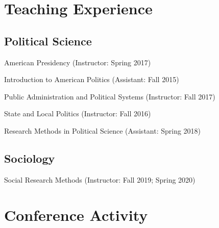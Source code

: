 \documentclass[12pt,letterpaper]{article}
\begin{document}
\section*{\sf Teaching Experience}

\subsection*{\sf Political Science}
American Presidency (Instructor: Spring 2017) \par
Introduction to American Politics (Assistant: Fall 2015) \par
Public Administration and Political Systems (Instructor: Fall 2017) \par
State and Local Politics (Instructor: Fall 2016) \par
Research Methods in Political Science (Assistant: Spring 2018) \par

\subsection*{\sf Sociology}
Social Research Methods (Instructor: Fall 2019; Spring 2020)

\section*{\sf Conference Activity}
\end{document}
